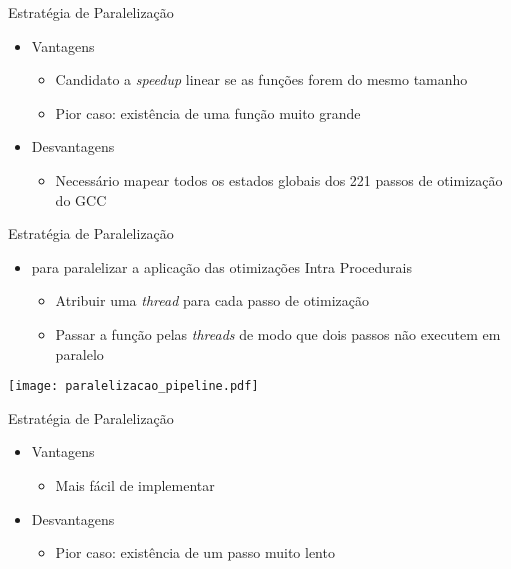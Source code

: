 \begin{frame}{Estratégia de Paralelização}
    \begin{itemize}
        \item Vantagens
            \begin{itemize}
                \item Candidato a \textit{speedup} linear se as funções forem do mesmo tamanho
                \item Pior caso: existência de uma função muito grande
            \end{itemize}
        \item Desvantagens
            \begin{itemize}
                \item Necessário mapear todos os estados globais dos 221 passos de otimização do GCC
            \end{itemize}
    \end{itemize}
\end{frame}

\begin{frame}{Estratégia de Paralelização}
    \begin{itemize}
        \item {\color{blue}{Estratégia alternativa}} para paralelizar a aplicação das otimizações Intra Procedurais
            \begin{itemize}
                \item Atribuir uma \textit{thread} para cada passo de otimização
                \item Passar a função pelas \textit{threads} de modo que dois passos não executem em paralelo
            \end{itemize}
    \end{itemize}
 \centering
 \texttt{[image: paralelizacao\_pipeline.pdf]}
\end{frame}

\begin{frame}{Estratégia de Paralelização}
    \begin{itemize}
        \item Vantagens
            \begin{itemize}
                \item Mais fácil de implementar
            \end{itemize}
        \item Desvantagens
            \begin{itemize}
                \item Pior caso: existência de um passo muito lento
            \end{itemize}

    \end{itemize}
\end{frame}



